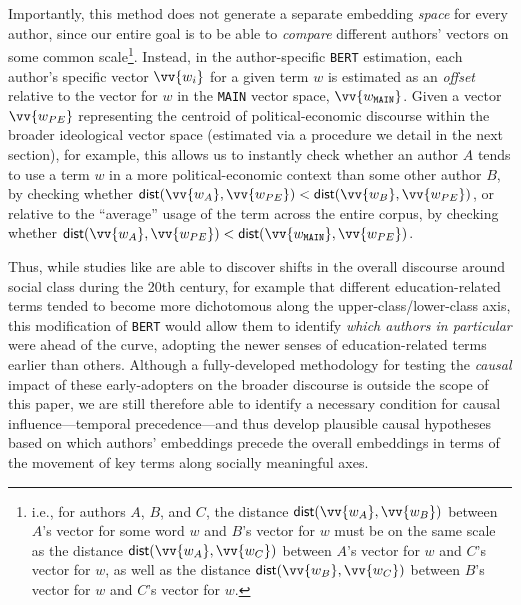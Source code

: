 \documentclass[11pt]{article}
\newcommand{\BERT}[0]{\texttt{BERT}}
\newcommand{\Dist}[0]{\mathsf{dist}}
\begin{document}
Importantly, this method does not generate a separate embedding \textit{space} for every author, since our entire goal is to be able to \textit{compare} different authors' vectors on some common scale\footnote{i.e., for authors $A$, $B$, and $C$, the distance $\Dist(\vv{w_A}, \vv{w_B})$ between $A$'s vector for some word $w$ and $B$'s vector for $w$ must be on the same scale as the distance $\Dist(\vv{w_A}, \vv{w_C})$ between $A$'s vector for $w$ and $C$'s vector for $w$, as well as the distance $\Dist(\vv{w_B}, \vv{w_C})$ between $B$'s vector for $w$ and $C$'s vector for $w$.}. Instead, in the author-specific \BERT{} estimation, each author's specific vector $\vv{w_i}$ for a given term $w$ is estimated as an \textit{offset} relative to the vector for $w$ in the \texttt{MAIN} vector space, $\vv{w_\texttt{MAIN}}$. Given a vector $\vv{w_{PE}}$ representing the centroid of political-economic discourse within the broader ideological vector space (estimated via a procedure we detail in the next section), for example, this allows us to instantly check whether an author $A$ tends to use a term $w$ in a more political-economic context than some other author $B$, by checking whether $\Dist(\vv{w_A},\vv{w_{PE}}) < \Dist(\vv{w_B},\vv{w_{PE}})$, or relative to the ``average'' usage of the term across the entire corpus, by checking whether $\Dist(\vv{w_A},\vv{w_{PE}}) < \Dist(\vv{w_\texttt{MAIN}},\vv{w_{PE}})$.

Thus, while studies like \cite{kozlowski_geometry_2019} are able to discover shifts in the overall discourse around social class during the 20th century, for example that different education-related terms tended to become more dichotomous along the upper-class/lower-class axis, this modification of \BERT{} would allow them to identify \textit{which authors in particular} were ahead of the curve, adopting the newer senses of education-related terms earlier than others. Although a fully-developed methodology for testing the \textit{causal} impact of these early-adopters on the broader discourse is outside the scope of this paper, we are still therefore able to identify a necessary condition for causal influence---temporal precedence---and thus develop plausible causal hypotheses based on which authors' embeddings precede the overall embeddings in terms of the movement of key terms along socially meaningful axes.
\end{document}
